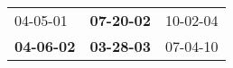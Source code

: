 \begin{supertabular}{p{0.33\columnwidth}p{0.33\columnwidth}p{0.33\columnwidth}}
          04-05-01\textsuperscript{} &  \textbf{07-20-02\textsuperscript{}} &  10-02-04\textsuperscript{} \\
 \textbf{04-06-02\textsuperscript{}} &  \textbf{03-28-03\textsuperscript{}} &  07-04-10\textsuperscript{} \\
\end{supertabular}
